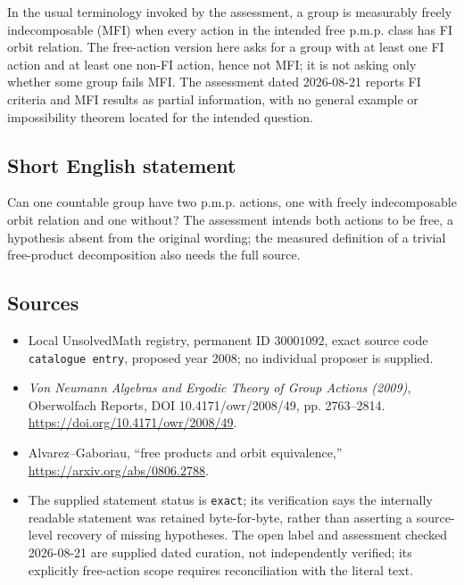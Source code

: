\documentclass[11pt]{article}
\begin{document}
In the usual terminology invoked by the assessment, a group is measurably freely indecomposable (MFI) when every action in the intended free p.m.p. class has FI orbit relation. The free-action version here asks for a group with at least one FI action and at least one non-FI action, hence not MFI; it is not asking only whether some group fails MFI. The assessment dated 2026-08-21 reports FI criteria and MFI results as partial information, with no general example or impossibility theorem located for the intended question.
\subsection{Short English statement}
Can one countable group have two p.m.p. actions, one with freely indecomposable orbit relation and one without? The assessment intends both actions to be free, a hypothesis absent from the original wording; the measured definition of a trivial free-product decomposition also needs the full source.
\subsection{Sources}
\begin{itemize}
\item Local UnsolvedMath registry, permanent ID \(30001092\), exact source code \texttt{catalogue entry}, proposed year 2008; no individual proposer is supplied.
\item \emph{Von Neumann Algebras and Ergodic Theory of Group Actions (2009)}, Oberwolfach Reports, DOI 10.4171/owr/2008/49, pp. 2763--2814. \url{https://doi.org/10.4171/owr/2008/49}.
\item Alvarez--Gaboriau, ``free products and orbit equivalence,'' \url{https://arxiv.org/abs/0806.2788}.
\item The supplied statement status is \texttt{exact}; its verification says the internally readable statement was retained byte-for-byte, rather than asserting a source-level recovery of missing hypotheses. The open label and assessment checked 2026-08-21 are supplied dated curation, not independently verified; its explicitly free-action scope requires reconciliation with the literal text.
\end{itemize}
\end{document}
